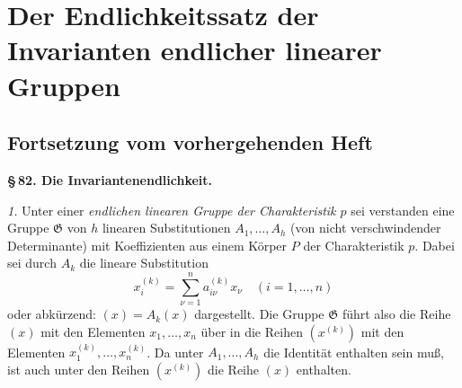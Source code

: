 \documentclass[12pt,a4paper]{article}
\newcommand{\fG}{\mathfrak{G}}
\theoremstyle{plain}
\theoremstyle{definition}
\theoremstyle{remark}
\begin{document}
\renewenvironment{noetherpaper}[4]{\newpage\section*{#1}\addcontentsline{toc}{section}{#1}\par\smallskip}{\par\medskip}


\newpage

\section*{Der Endlichkeitssatz der Invarianten endlicher linearer Gruppen}

\subsection*{Fortsetzung vom vorhergehenden Heft}

\begin{center}
\textbf{\S\,82. Die Invariantenendlichkeit.}
\end{center}

\setcounter{section}{82}
\setcounter{subsection}{1}
\setcounter{Satz}{0}

\noindent
\textit{1.} Unter einer \textit{endlichen linearen Gruppe der Charakteristik $p$} sei verstanden eine Gruppe $\fG$ von $h$ linearen Substitutionen $A_{1},\dots,A_{h}$ (von nicht verschwindender Determinante) mit Koeffizienten aus einem Körper $P$ der Charakteristik $p$. Dabei sei durch $A_{k}$ die lineare Substitution
\[
x_{i}^{(k)} = \sum_{\nu=1}^{n} a_{i\nu}^{(k)} x_{\nu} \quad (i = 1,\dots,n)
\]
oder abkürzend: $(x) = A_{k}(x)$ dargestellt. Die Gruppe $\fG$ führt also die Reihe $(x)$ mit den Elementen $x_{1},\dots,x_{n}$ über in die Reihen $(x^{(k)})$ mit den Elementen $x_{1}^{(k)},\dots,x_{n}^{(k)}$. Da unter $A_{1},\dots,A_{h}$ die Identität enthalten sein muß, ist auch unter den Reihen $(x^{(k)})$ die Reihe $(x)$ enthalten.
\end{document}
